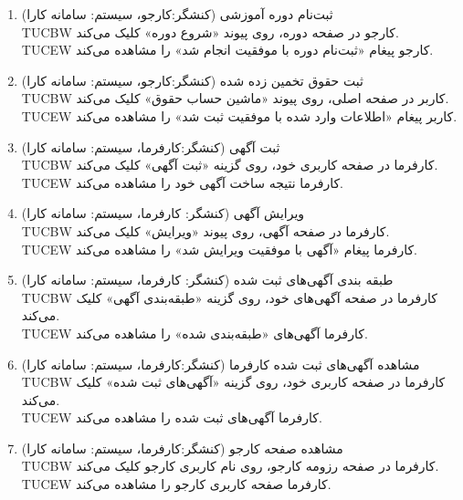 \documentclass[12pt]{article}
\begin{document}
\begin{enumerate}
		\item
		ثبت‌نام دوره‌ آموزشی (کنشگر:‌کارجو، سیستم: سامانه کارا)\\
		TUCBW کارجو در صفحه دوره، روی پیوند «شروع دوره» کلیک می‌کند.\\
		TUCEW کارجو پیغام «ثبت‌نام دوره با موفقیت انجام شد» را مشاهده می‌کند.\\

		\item
		ثبت حقوق تخمین زده شده (کنشگر:‌کارجو، سیستم: سامانه کارا)\\
		TUCBW کاربر در صفحه اصلی، روی پیوند «ماشین حساب حقوق» کلیک می‌کند.\\
		TUCEW کاربر پیغام «اطلاعات وارد شده با موفقیت ثبت شد» را مشاهده می‌کند.\\

		\item
		ثبت آگهی (کنشگر:‌کارفرما، سیستم: سامانه کارا)\faStar\\
		TUCBW کارفرما در صفحه کاربری خود، روی گزینه «ثبت آگهی» کلیک می‌کند.\\
		TUCEW کارفرما نتیجه ساخت آگهی خود را مشاهده می‌کند.\\

		\item
		ویرایش آگهی (کنشگر:‌ کارفرما، سیستم: سامانه کارا)\\
		TUCBW کارفرما در صفحه آگهی، روی پیوند «ویرایش» کلیک می‌کند.\\
		TUCEW کارفرما پیغام «آگهی با موفقیت ویرایش شد» را مشاهده می‌کند.\\

		\item
		طبقه بندی آگهی‌های ثبت شده (کنشگر:‌ کارفرما، سیستم: سامانه کارا)\\
		TUCBW کارفرما در صفحه آگهی‌های خود، روی گزینه «طبقه‌بندی آگهی» کلیک می‌کند.\\
		TUCEW کارفرما آگهی‌های «طبقه‌بندی شده» را مشاهده می‌کند.\\

		\item
		مشاهده آگهی‌های ثبت شده کارفرما (کنشگر:‌کارفرما، سیستم: سامانه کارا)\\
		TUCBW کارفرما در صفحه کاربری خود، روی گزینه «آگهی‌های ثبت شده» کلیک می‌کند.\\
		TUCEW کارفرما آگهی‌های ثبت شده را مشاهده می‌کند.\\

		\item
		مشاهده صفحه کارجو (کنشگر:‌کارفرما، سیستم: سامانه کارا)\\
		TUCBW کارفرما در صفحه رزومه کارجو، روی نام کاربری کارجو کلیک می‌کند.\\
		TUCEW کارفرما صفحه کاربری کارجو را مشاهده می‌کند.\\


\end{enumerate}
\end{document}
